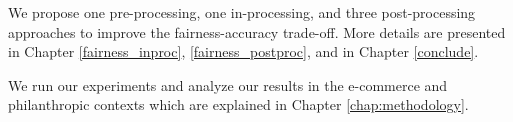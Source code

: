 We propose one pre-processing, one in-processing, and three post-processing approaches to improve the fairness-accuracy trade-off. More details are presented in Chapter \ref{fairness_inproc}, \ref{fairness_postproc}, and in Chapter \ref{conclude}.


We run our experiments and analyze our results in the e-commerce and philanthropic contexts which are explained in Chapter \ref{chap:methodology}.





